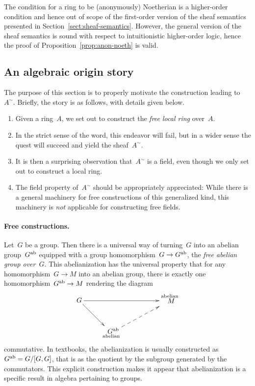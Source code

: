 \documentclass{ws-rv9x6}
\begin{document}
{\begin{remark}The condition for a ring to be (anonymously) Noetherian is a
higher-order condition and hence out of scope of the first-order version of the
sheaf semantics presented in Section~\ref{sect:sheaf-semantics}. However, the
general version of the sheaf semantics is sound with respect to intuitionistic
higher-order logic, hence the proof of Proposition~\ref{prop:anon-noeth} is
valid.
\end{remark}


\subsection{An algebraic origin story}
\label{sect:origins}

The purpose of this section is to properly motivate the construction
leading to~$A^\sim$. Briefly, the story is as follows, with details given
below.
\begin{enumerate}
\item Given a ring~$A$, we set out to construct the \emph{free local ring}
over~$A$.
\item In the strict sense of the word, this endeavor will fail, but in a wider
sense the quest will succeed and yield the sheaf~$A^\sim$.
\item It is then a surprising observation that~$A^\sim$ is a field, even though
we only set out to construct a local ring.
\item The field property of~$A^\sim$ should be appropriately appreciated: While
there is a general machinery for free constructions of this generalized kind, this
machinery is \emph{not} applicable for constructing free fields.
\end{enumerate}

\paragraph{Free constructions.}
Let~$G$ be a group. Then there is a universal way of turning~$G$ into an abelian
group~$G^{\mathrm{ab}}$ equipped with a group homomorphism~$G \to G^{\mathrm{ab}}$, the \emph{free
abelian group over~$G$}. This abelianization has the universal property that
for any homomorphism~$G \to M$ into an abelian group, there is exactly one
homomorphism~$G^{\mathrm{ab}} \to M$ rendering the diagram
\[ \xymatrix{
  G \ar[rd] \ar[rrr] &&& {\substack{\text{abelian}\\\text{\normalsize$\!M$}\\\phantom{\text{abelian}}}} \\
  & {\substack{\text{\normalsize$G^\ab$}\\\text{abelian}}} \ar@{-->}_[@!29]{}[rru]
} \]
commutative. In textbooks, the abelianization is usually constructed as~$G^{\mathrm{ab}}
= G/[G,G]$, that is as the quotient by the subgroup generated by the
commutators. This explicit construction makes it appear that abelianization
is a specific result in algebra pertaining to groups.

}
\end{document}

